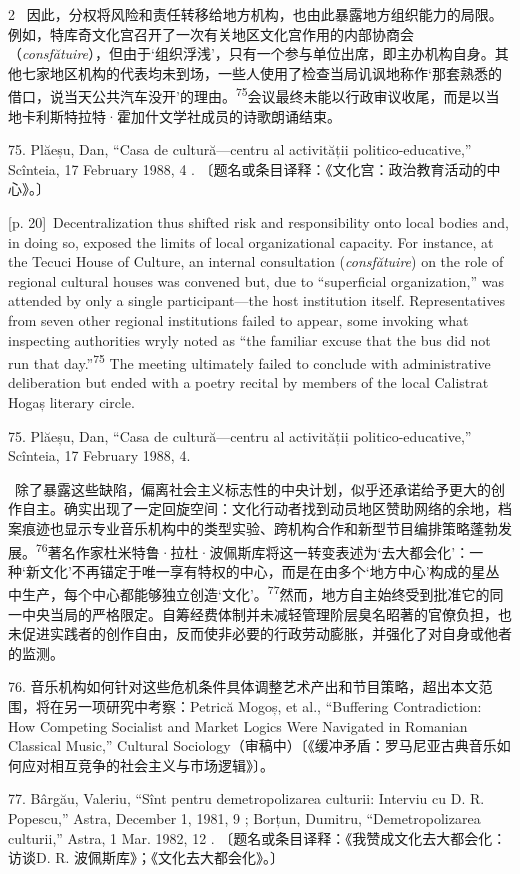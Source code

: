 \documentclass[10pt,a4paper]{article}
\begin{document}
\begin{paracol}{2}
\switchcolumn*
{\scriptsize\color{gray} [p. 20]}\ 因此，分权将风险和责任转移给地方机构，也由此暴露地方组织能力的局限。例如，特库奇文化宫召开了一次有关地区文化宫作用的内部协商会（\textit{consfătuire}），但由于‘组织浮浅’，只有一个参与单位出席，即主办机构自身。其他七家地区机构的代表均未到场，一些人使用了检查当局讥讽地称作‘那套熟悉的借口，说当天公共汽车没开’的理\mbox{由。\textsuperscript{75}}会议最终未能以行政审议收尾，而是以当地卡利斯特拉特·霍加什文学社成员的诗歌朗诵结束。\par{\small 75. Plăeșu, Dan, “Casa de cultură—centru al activității politico-educative,” Scînteia, 17 February 1988, 4 . 〔题名或条目译释：《文化宫：政治教育活动的中心》。〕\par}
\switchcolumn
{\scriptsize\color{gray} [p. 20]}\ Decentralization thus shifted risk and responsibility onto local bodies and, in doing so, exposed the limits of local organizational capacity. For instance, at the Tecuci House of Culture, an internal consultation (\textit{consfătuire}) on the role of regional cultural houses was convened but, due to “superficial organization,” was attended by only a single participant—the host institution itself. Representatives from seven other regional institutions failed to appear, some invoking what inspecting authorities wryly noted as “the familiar excuse that the bus did not run that day.”\nobreak\textsuperscript{75} The meeting ultimately failed to conclude with administrative deliberation but ended with a poetry recital by members of the local Calistrat Hogaș literary circle.\par{\small 75. Plăeșu, Dan, “Casa de cultură—centru al activității politico-educative,” Scînteia, 17 February 1988, 4.\par}
\switchcolumn*
{\scriptsize\color{gray} [p. 21]}\ 除了暴露这些缺陷，偏离社会主义标志性的中央计划，似乎还承诺给予更大的创作自主。确实出现了一定回旋空间：文化行动者找到动员地区赞助网络的余地，档案痕迹也显示专业音乐机构中的类型实验、跨机构合作和新型节目编排策略蓬勃发\mbox{展。\textsuperscript{76}}著名作家杜米特鲁·拉杜·波佩斯库将这一转变表述为‘去大都会化’：一种‘新文化’不再锚定于唯一享有特权的中心，而是在由多个‘地方中心’构成的星丛中生产，每个中心都能够独立创造‘文化’。\nobreak\textsuperscript{77}然而，地方自主始终受到批准它的同一中央当局的严格限定。自筹经费体制并未减轻管理阶层臭名昭著的官僚负担，也未促进实践者的创作自由，反而使非必要的行政劳动膨胀，并强化了对自身或他者的监测。\par{\small 76. 音乐机构如何针对这些危机条件具体调整艺术产出和节目策略，超出本文范围，将在另一项研究中考察：Petrică Mogoș, et al., “Buffering Contradiction: How Competing Socialist and Market Logics Were Navigated in Romanian Classical Music,” Cultural Sociology（审稿中）〔《缓冲矛盾：罗马尼亚古典音乐如何应对相互竞争的社会主义与市场逻辑》〕。\par}{\small 77. Bârgău, Valeriu, “Sînt pentru demetropolizarea culturii: Interviu cu D. R. Popescu,” Astra, December 1, 1981, 9 ; Borțun, Dumitru, “Demetropolizarea culturii,” Astra, 1 Mar. 1982, 12 . 〔题名或条目译释：《我赞成文化去大都会化：访谈D. R. 波佩斯库》；《文化去大都会化》。〕\par}

\end{paracol}
\end{document}
